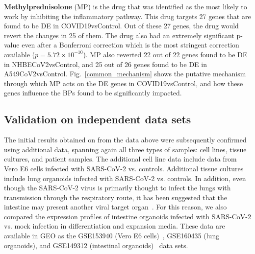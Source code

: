  \textbf{Methylprednisolone} (MP) is the drug that was identified as the most likely to work by inhibiting the inflammatory pathway. This drug targets 27 genes that are found to be DE in COVID19vsControl. Out of these 27 genes, the drug would revert the changes in 25 of them. The drug also had an extremely significant p-value even after a Bonferroni correction which is the most stringent correction available ($p=5.72\times 10^{-10}$). MP also reverted 22 out of 22 genes found to be DE in NHBECoV2vsControl, and 25 out of 26 genes found to be DE in A549CoV2vsControl. 
Fig.~\ref{common_mechanism}  shows the putative mechanism through which MP acts on the DE genes in COVID19vsControl, and how these genes influence the BPs found to be significantly impacted.



\subsection{Validation on independent data sets}
The initial results obtained on from the data above were subsequently confirmed using additional data, spanning again all  three types of samples: cell lines, tissue cultures, and patient samples.   The additional cell line data include data from Vero E6 cells infected with SARS-CoV-2 vs. controls. Additional tissue cultures include lung organoids infected with SARS-CoV-2 vs. controls. In addition, even though the SARS-CoV-2 virus is primarily thought to infect the lungs with transmission through the respiratory route, it has been suggested that the intestine may present another viral target organ~\cite{Lamers:2020}. For this reason, we also compared the expression profiles of intestine organoids infected with SARS-CoV-2 vs. mock infection in differentiation and expansion media. These data are available in GEO as the GSE153940 (Vero E6 cells)~\cite{Riva:2020}, GSE160435 (lung organoids), and GSE149312 (intestinal organoids)~\cite{Lamers:2020} data sets. 

